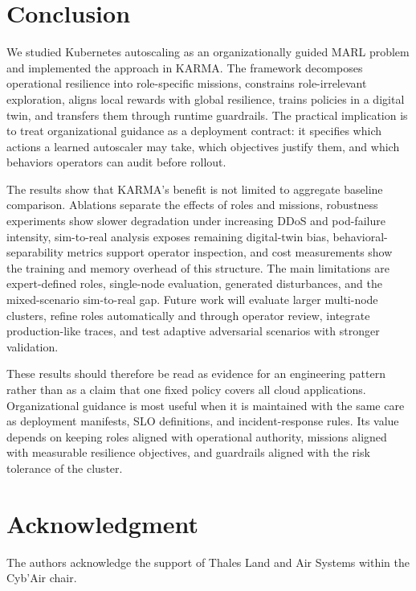 \documentclass[journal]{IEEEtran}
\begin{document}
\section{Conclusion}
\label{sec:conclusion}

We studied Kubernetes autoscaling as an organizationally guided MARL problem and implemented the approach in KARMA. The framework decomposes operational resilience into role-specific missions, constrains role-irrelevant exploration, aligns local rewards with global resilience, trains policies in a digital twin, and transfers them through runtime guardrails. The practical implication is to treat organizational guidance as a deployment contract: it specifies which actions a learned autoscaler may take, which objectives justify them, and which behaviors operators can audit before rollout.

The results show that KARMA's benefit is not limited to aggregate baseline comparison. Ablations separate the effects of roles and missions, robustness experiments show slower degradation under increasing DDoS and pod-failure intensity, sim-to-real analysis exposes remaining digital-twin bias, behavioral-separability metrics support operator inspection, and cost measurements show the training and memory overhead of this structure. The main limitations are expert-defined roles, single-node evaluation, generated disturbances, and the mixed-scenario sim-to-real gap. Future work will evaluate larger multi-node clusters, refine roles automatically and through operator review, integrate production-like traces, and test adaptive adversarial scenarios with stronger validation.

These results should therefore be read as evidence for an engineering pattern rather than as a claim that one fixed policy covers all cloud applications. Organizational guidance is most useful when it is maintained with the same care as deployment manifests, SLO definitions, and incident-response rules. Its value depends on keeping roles aligned with operational authority, missions aligned with measurable resilience objectives, and guardrails aligned with the risk tolerance of the cluster.

\section*{Acknowledgment}
The authors acknowledge the support of Thales Land and Air Systems within the Cyb'Air chair.



\end{document}
